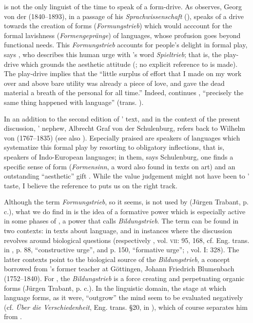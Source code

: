 \documentclass[output=paper]{langscibook}
\begin{document}
{\Sapir} is not the only linguist of the time to speak of a form-drive. As \citet{McElvenny2016} observes, Georg von der {\Gabelentz} (1840--1893), in a passage of his \emph{Sprachwissenschaft} (\citeyear{Gabelentz20161891}), speaks of a drive towards the creation of forms (\emph{Formungs\-trieb}) which would acccount for the formal lavishness (\emph{Formengeprän\-ge}) of languages, whose profusion goes beyond functional needs. This \emph{Formungs\-trieb} accounts for people's delight in formal play, says {\Gabelentz}, who describes this human urge with {\Schiller}'s word \emph{Spieltrieb}; that is, the play-drive which grounds the aesthetic attitude (\citealt[381]{Gabelentz20161891}; no explicit reference to {\Schiller} is made). The play-drive implies that the ``little surplus of effort that I made on my work over and above bare utility was already a piece of love, and gave the dead material a breath of the personal for all time.'' Indeed, continues \citet[344]{Gabelentz20161891}, ``precisely the same thing happened with language'' (trans. \citealt[35]{McElvenny2016}).

In an addition to the second edition of {\Gabelentz}' text, and in the context of the present discussion, {\Gabelentz}' nephew, Albrecht Graf von der Schulenburg, refers back to Wilhelm von {\Humboldt} (1767--1835) (see also \citealt{McElvenny2017a}). Especially praised are speakers of languages which systematize this formal play by resorting to obligatory inflections, that is, speakers of Indo-European languages; in them, says Schulenburg, one finds a specific sense of form (\emph{Formensinn}, a word also found in texts on art) and an outstanding ``aesthetic'' gift \citep[394]{Gabelentz20161891}. While the value judgement might not have been to {\Gabelentz}' taste, I believe the reference to {\Humboldt} puts us on the right track.

Although the term \emph{Formungstrieb}, so it seems, is not used by {\Humboldt} (Jürgen Trabant, p. c.), what we do find in {\Humboldt} is the idea of a formative power which is especially active in some phases of , a power that {\Humboldt} calls \emph{Bildungstrieb}. The term can be found in two contexts: in texts about language, and in instances where the discussion revolves around biological questions (respectively \citealt{Humboldt1907}, vol. \textsc{vii}: 95, 168, cf. Eng. trans. in \citealt{Humboldt1988}, p. 88, ``constructive urge'', and p. 150, ``formative urge''; \citealt{Humboldt1903}, vol. I: 328). The latter contexts point to the biological source of the \emph{Bildungstrieb}, a concept borrowed from {\Humboldt}'s former teacher at Göttingen, Johann Friedrich Blumenbach (1752--1840). For \citet{Blumenbach1781}, the \emph{Bildungstrieb} is a force creating and perpetuating organic forms (Jürgen Trabant, p. c.). In the linguistic domain, the stage at which language forms, as it were, ``outgrow'' the mind seem to be evaluated negatively (cf. \emph{Über die Verschiedenheit}, Eng. trans. §20, in \citealt{Humboldt1988}), which of course separates him from {\Sapir}.
\end{document}
